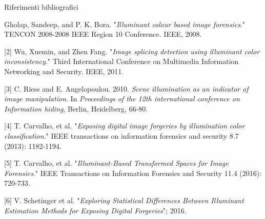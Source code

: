 \begin{tframe}{Riferimenti bibliografici}

\begin{scriptsize}
[1] Gholap, Sandeep, and P. K. Bora. "\emph{Illuminant colour based image forensics}." TENCON 2008-2008 IEEE Region 10 Conference. IEEE, 2008.

\vspace{0.1in}

[2] Wu, Xuemin, and Zhen Fang. "\emph{Image splicing detection using illuminant color inconsistency}." Third International Conference on Multimedia Information Networking and Security. IEEE, 2011.

\vspace{0.1in}

[3] C. Riess and E. Angelopoulou. 2010. \emph{Scene illumination as an indicator of image manipulation}. In \emph{Proceedings of the 12th international conference on Information hiding}, Berlin, Heidelberg, 66-80.

\vspace{0.1in}

[4] T. Carvalho, et al. "\emph{Exposing digital image forgeries by illumination color classification}." IEEE transactions on information forensics and security 8.7 (2013): 1182-1194.

\vspace{0.1in}

[5] T. Carvalho, et al. "\emph{Illuminant-Based Transformed Spaces for Image Forensics}." IEEE Transactions on Information Forensics and Security 11.4 (2016): 720-733.

\vspace{0.1in}

[6] V. Schetinger et al. "\emph{Exploring Statistical Differences Between Illuminant Estimation Methods for Exposing Digital Forgeries}"; 2016.
\end{scriptsize}

\end{tframe}